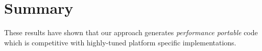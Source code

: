 \section{Summary}

These results have shown that our approach generates \emph{performance portable} code which is competitive with highly-tuned platform specific implementations.

%














